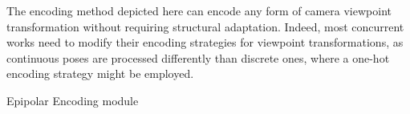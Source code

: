 The encoding method depicted here can encode any form of camera viewpoint transformation without requiring structural adaptation. Indeed, most concurrent works need to modify their encoding strategies for viewpoint transformations, as continuous poses are processed differently than discrete ones, where a one-hot encoding strategy might be employed. 

\begin{algorithm}[h!]
    \caption{Epipolar Encoding module \label{alg:pseudoCode}}
    
    \medskip
    
\end{algorithm}

